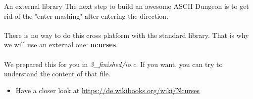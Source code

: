 \begin{frame}{An external library}
	The next step to build an awesome ASCII Dungeon is to get rid of the "enter mashing" after entering the direction.\\\ \\
	There is no way to do this cross platform with the standard library. That is why we will use an external one: \textbf{ncurses}.\\\ \\
	We prepared this for you in \textit{3\_finished/io.c}. If you want, you can try to understand the content of that file.
	\begin{itemize}
		\item Have a closer look at \url{https://de.wikibooks.org/wiki/Ncurses}
	\end{itemize}
\end{frame}


